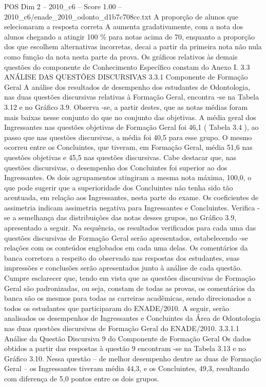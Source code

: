 \begin{textsample}{POS Dim 2 – 2010\_c6 – Score 1.00 – 2010\_c6/enade\_2010\_odonto\_d1b7c708cc.txt}
A proporção de alunos que selecionaram a resposta correta A aumenta gradativamente, com a nota dos alunos chegando a atingir 100 \% para notas acima de 70, enquanto a proporção dos que escolhem alternativas incorretas, decai a partir da primeira nota não nula como função da nota nesta parte da prova.
Os gráficos relativos às demais questões do componente de Conhecimento Específico constam do Anexo I. 3.3 ANÁLISE DAS QUESTÕES DISCURSIVAS 3.3.1 Componente de Formação Geral A análise dos resultados de desempenho dos estudantes de Odontologia, nas duas questões discursivas relativas à Formação Geral, encontra -se na Tabela 3.12 e no Gráfico 3.9.
Observa -se, a partir destes, que as notas médias foram mais baixas nesse conjunto do que no conjunto das objetivas.
A média geral dos Ingressantes nas questões objetivas de Formação Geral foi 46,1 ( Tabela 3.4 ), ao passo que nas questões discursivas, a média foi 40,5 para esse grupo.
O mesmo ocorreu entre os Concluintes, que tiveram, em Formação Geral, média 51,6 nas questões objetivas e 45,5 nas questões discursivas.
Cabe destacar que, nas questões discursivas, o desempenho dos Concluintes foi superior ao dos Ingressantes.
Os dois agrupamentos atingiram a mesma nota máxima, 100,0, o que pode sugerir que a superioridade dos Concluintes não tenha sido tão acentuada, em relação aos Ingressantes, nesta parte do exame.
Os coeficientes de assimetria indicam assimetria negativa para Ingressantes e Concluintes.
Verifica -se a semelhança das distribuições das notas desses grupos, no Gráfico 3.9, apresentado a seguir.
Na sequência, os resultados verificados para cada uma das questões discursivas de Formação Geral serão apresentados, estabelecendo -se relações com os conteúdos englobados em cada uma delas.
Os comentários da banca corretora a respeito do observado nas respostas dos estudantes, suas impressões e conclusões serão apresentados junto à análise de cada questão.
Cumpre esclarecer que, tendo em vista que as questões discursivas de Formação Geral são padronizadas, ou seja, constam de todas as provas, os comentários da banca são os mesmos para todas as carreiras acadêmicas, sendo direcionados a todos os estudantes que participaram do ENADE/2010.
A seguir, serão analisados os desempenhos de Ingressantes e Concluintes da Área de Odontologia nas duas questões discursivas de Formação Geral do ENADE/2010. 3.3.1.1 Análise da Questão Discursiva 9 do Componente de Formação Geral Os dados obtidos a partir das respostas à questão 9 encontram -se na Tabela 3.13 e no Gráfico 3.10.
Nessa questão – de melhor desempenho dentre as duas de Formação Geral – os Ingressantes tiveram média 44,3, e os Concluintes, 49,3, resultando com diferença de 5,0 pontos entre os dois grupos.

\end{textsample}
